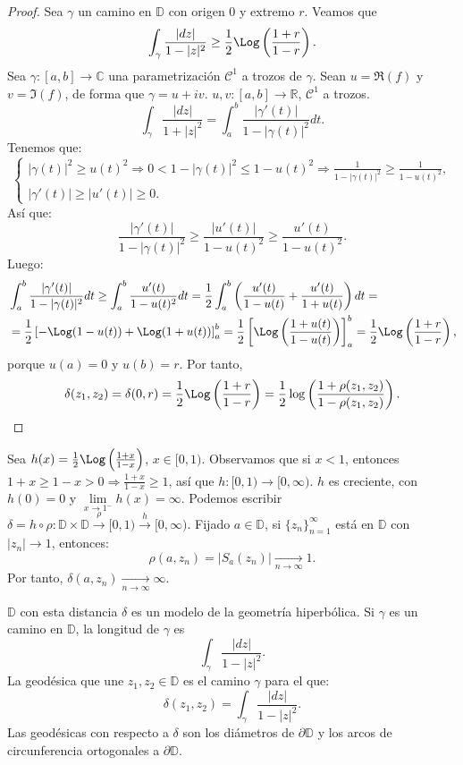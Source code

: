 \begin{proof}
    Sea $\gamma$ un camino en $\mathbb{D}$ con origen 0 y extremo $r$.
    Veamos que
    $$\int_\gamma \frac{|dz|}{1-|z|^2} \geq \frac{1}{2} \Log\left(\frac{1+r}{1-r}\right).$$
    Sea $\gamma: [a, b] \to \mathbb{C}$ una parametrización $\mathcal{C}^1$ a trozos de $\gamma$.
    Sean $u = \Re(f)$ y $v= \Im(f)$, de forma que $\gamma = u + iv$.
    $u, v: [a, b] \to \mathbb{R}$, $\mathcal{C}^1$ a trozos.
    $$\int_\gamma \frac{|dz|}{1+|z|^2} = \int_a^b \frac{|\gamma'(t)|}{1-|\gamma(t)|^2}dt.$$
    Tenemos que:
    $$\begin{cases}
            |\gamma(t)|^2 \geq u(t)^2 \Rightarrow 0 < 1-|\gamma(t)|^2 \leq 1-u(t)^2 \Rightarrow \frac{1}{1-|\gamma(t)|^2} \geq \frac{1}{1-u(t)^2}, \\
            |\gamma'(t)| \geq |u'(t)| \geq 0.
        \end{cases}$$
    Así que:
    $$\frac{|\gamma'(t)|}{1-|\gamma(t)|^2} \geq \frac{|u'(t)|}{1-u(t)^2} \geq \frac{u'(t)}{1-u(t)^2}.$$
    Luego:
    \begin{align*}
         & \int_a^b \frac{|\gamma'(t)|}{1-|\gamma(t)|^2}dt \geq \int_a^b \frac{u'(t)}{1-u(t)^2}dt = \frac{1}{2} \int_a^b \left(\frac{u'(t)}{1-u(t)} + \frac{u'(t)}{1+u(t)}\right)dt =        \\
         & = \frac{1}{2} \left[-\Log(1-u(t)) + \Log(1+u(t))\right]_a^b = \frac{1}{2} \left[\Log\left(\frac{1+u(t)}{1-u(t)}\right)\right]_a^b = \frac{1}{2} \Log\left(\frac{1+r}{1-r}\right),
    \end{align*}
    porque $u(a) = 0$ y $u(b) = r$.
    Por tanto,
    $$\delta(z_1, z_2) = \delta(0, r) = \frac{1}{2} \Log\left(\frac{1+r}{1-r}\right) = \frac{1}{2} \log\left(\frac{1+\rho(z_1, z_2)}{1-\rho(z_1, z_2)}\right).$$
\end{proof}

\begin{remark}
    Sea $h(x) = \frac{1}{2} \Log\left(\frac{1+x}{1-x}\right)$, $x \in [0, 1)$.
    Observamos que si $x < 1$, entonces $1+x \geq 1-x > 0 \Rightarrow \frac{1+x}{1-x} \geq 1$, así que $h: [0, 1) \to [0, \infty)$.
    $h$ es creciente, con $h(0) = 0$ y $\lim\limits_{x \to 1^-} h(x) = \infty$.
    Podemos escribir $\delta = h \circ \rho : \mathbb{D} \times \mathbb{D} \xrightarrow{\rho} [0, 1) \xrightarrow{h} [0, \infty)$.
    Fijado $a \in \mathbb{D}$, si $\{z_n\}_{n=1}^\infty$ está en $\mathbb{D}$ con $|z_n| \to 1$, entonces:
    $$\rho(a, z_n) = |S_a(z_n)| \xrightarrow[n \to \infty]{} 1.$$
    Por tanto, $\delta(a, z_n) \xrightarrow[n \to \infty]{} \infty$.
\end{remark}

$\mathbb{D}$ con esta distancia $\delta$ es un modelo de la geometría hiperbólica.
Si $\gamma$ es un camino en $\mathbb{D}$, la longitud de $\gamma$ es
$$\int_\gamma \frac{|dz|}{1-|z|^2}.$$
La geodésica que une $z_1, z_2 \in \mathbb{D}$ es el camino $\gamma$ para el que:
$$\delta(z_1, z_2) = \int_\gamma \frac{|dz|}{1-|z|^2}.$$
Las geodésicas con respecto a $\delta$ son los diámetros de $\partial \mathbb{D}$ y los arcos de circunferencia ortogonales a $\partial \mathbb{D}$.